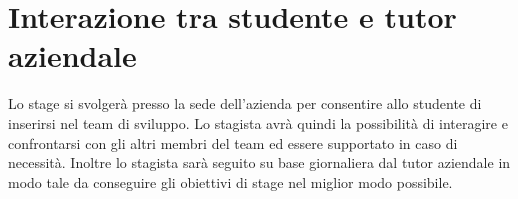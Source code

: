 \section*{Interazione tra studente e tutor aziendale}


Lo stage si svolgerà presso la sede dell'azienda per consentire allo studente di inserirsi nel team di sviluppo. Lo stagista avrà quindi la possibilità di interagire e confrontarsi con gli altri membri del team ed essere supportato in caso di necessità.
Inoltre lo stagista sarà seguito su base giornaliera dal tutor aziendale in modo tale da conseguire gli obiettivi di stage nel miglior modo possibile.